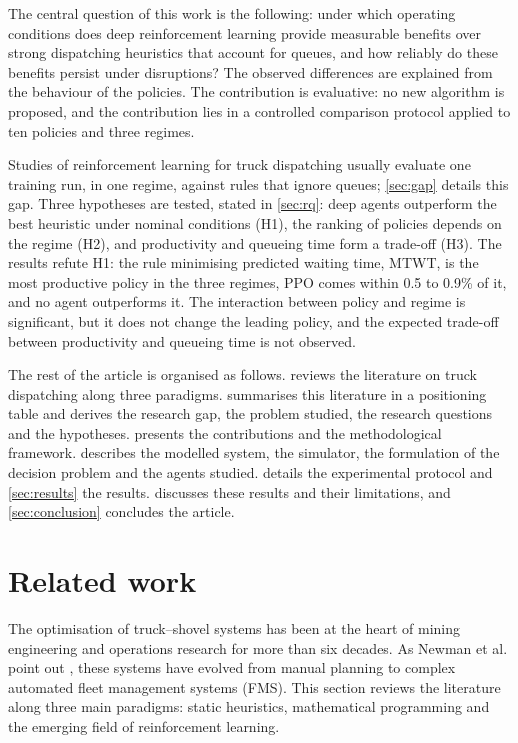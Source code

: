 \documentclass[11pt,a4paper]{article}
\newif\ifrevmarks
\newcommand{\revtag}[1]{\ifrevmarks\textsuperscript{\textcolor{red!70!black}{\scriptsize[#1]}}\fi}
\newcommand{\rev}[2]{\ifrevmarks{\color{revcolor}#2}\revtag{#1}\else#2\fi}
\newenvironment{revbloc}[1]{\par\ifrevmarks\color{revcolor}\noindent\revtag{#1}\ \fi}{\par}
\newif\ifcorrmarks
\newcommand{\corr}[1]{\ifcorrmarks\textcolor{corrcolor}{#1}\else#1\fi}
\begin{document}
\begin{revbloc}{M23, M24}
\corr{The central question of this work is the following: under which operating conditions does deep reinforcement learning provide measurable benefits over strong dispatching heuristics that account for queues, and how reliably do these benefits persist under disruptions? The observed differences are explained from the behaviour of the policies.} The contribution is evaluative: no new algorithm is proposed, and the contribution lies in a controlled comparison protocol applied to \rev{T31}{ten policies} and three regimes.

\corr{Studies of reinforcement learning for truck dispatching usually evaluate one training run, in one regime, against rules that ignore queues; \cref{sec:gap} details this gap. Three hypotheses are tested, stated in \cref{sec:rq}: deep agents outperform the best heuristic under nominal conditions (H1), the ranking of policies depends on the regime (H2), and productivity and queueing time form a trade-off (H3). The results refute H1: the rule minimising predicted waiting time, MTWT, is the most productive policy in the three regimes, PPO comes within 0.5 to 0.9\% of it, and no agent outperforms it. The interaction between policy and regime is significant, but it does not change the leading policy, and the expected trade-off between productivity and queueing time is not observed.}

The rest of the article is organised as follows.  reviews the literature on truck dispatching along three paradigms.  summarises this literature in a positioning table and derives the research gap, the problem studied, the research questions and the hypotheses.  presents the contributions and the methodological framework.  describes the modelled system, the simulator, the formulation of the decision problem and the agents studied.  details the experimental protocol and \cref{sec:results} the results.  discusses these results and their limitations, and \cref{sec:conclusion} concludes the article.
\end{revbloc}



\section{Related work}
\label{sec:relwork}

The optimisation of truck--shovel systems has been at the heart of mining engineering and operations research for more than six decades. \rev{m22}{As Newman et al. point out} \cite{AlexandraNewman2010}, these systems have evolved from manual planning to complex automated fleet management systems (FMS). This section reviews the literature along three main paradigms: static heuristics, mathematical programming and the emerging field of reinforcement learning.
\end{document}
